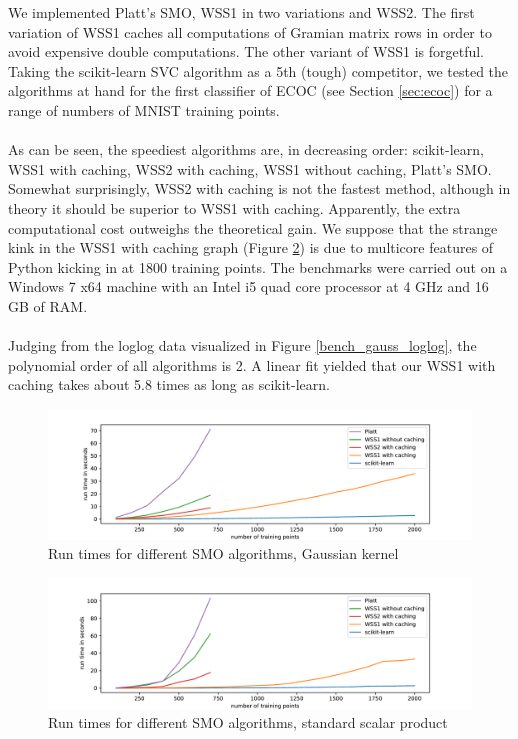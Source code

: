 We implemented Platt's SMO, WSS1 in two variations and WSS2. The first variation of WSS1 caches all computations of Gramian matrix rows in order to avoid expensive double computations. The other variant of WSS1 is forgetful. Taking the scikit-learn SVC algorithm as a 5th (tough) competitor, we tested the algorithms at hand for the first classifier of ECOC (see Section \ref{sec:ecoc}) for a range of numbers of MNIST training points. \\\\
As can be seen, the speediest algorithms are, in decreasing order: scikit-learn, WSS1 with caching, WSS2 with caching, WSS1 without caching, Platt's SMO. Somewhat surprisingly, WSS2 with caching is not the fastest method, although in theory it should be superior to WSS1 with caching. Apparently, the extra computational cost outweighs the theoretical gain. We suppose that the strange kink in the WSS1 with caching graph (Figure \ref{bench_ssp}) is due to multicore features of Python kicking in at 1800 training points. The benchmarks were carried out on a Windows 7 x64 machine with an Intel i5 quad core processor at 4 GHz and 16 GB of RAM.\\\\
Judging from the loglog data visualized in Figure \ref{bench_gauss_loglog}, the polynomial order of all algorithms is 2. A linear fit yielded that our WSS1 with caching takes about 5.8 times as long as scikit-learn.

\begin{figure}[h!]
	\includegraphics[width=1\textwidth, center]{benchplot_gauss.pdf}
	\caption{Run times for different SMO algorithms, Gaussian kernel}
	\label{bench_gauss}
\end{figure}

\begin{figure}[h!]
	\includegraphics[width=1\textwidth, center]{benchplot_ssp.pdf}
	\caption{Run times for different SMO algorithms, standard scalar product}
	\label{bench_ssp}
\end{figure}

